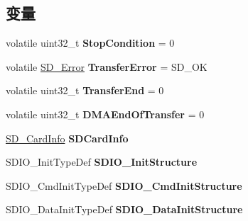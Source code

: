 \subsection*{变量}
\begin{DoxyCompactItemize}
\item 
volatile uint32\+\_\+t {\bfseries Stop\+Condition} = 0\hypertarget{group__sd__card__private_gaca9d38169402effc401361f52be012b7}{}\label{group__sd__card__private_gaca9d38169402effc401361f52be012b7}

\item 
volatile \hyperlink{group__sd__card_gacff91fa68daa1d1ee967b5b3fb3dbd8c}{S\+D\+\_\+\+Error} {\bfseries Transfer\+Error} = S\+D\+\_\+\+OK\hypertarget{group__sd__card__private_ga693e3b9d09509f9fd42386a5fc31bd0d}{}\label{group__sd__card__private_ga693e3b9d09509f9fd42386a5fc31bd0d}

\item 
volatile uint32\+\_\+t {\bfseries Transfer\+End} = 0\hypertarget{group__sd__card__private_ga2504eb031f79ab67e7b175815ea10cfc}{}\label{group__sd__card__private_ga2504eb031f79ab67e7b175815ea10cfc}

\item 
volatile uint32\+\_\+t {\bfseries D\+M\+A\+End\+Of\+Transfer} = 0\hypertarget{group__sd__card__private_gab4965c9dd85c339abfefd3fa9bf30bf4}{}\label{group__sd__card__private_gab4965c9dd85c339abfefd3fa9bf30bf4}

\item 
\hyperlink{struct_s_d___card_info}{S\+D\+\_\+\+Card\+Info} {\bfseries S\+D\+Card\+Info}\hypertarget{group__sd__card__private_gad9b4efaae93cd75532b18c0528a4ca3d}{}\label{group__sd__card__private_gad9b4efaae93cd75532b18c0528a4ca3d}

\item 
S\+D\+I\+O\+\_\+\+Init\+Type\+Def {\bfseries S\+D\+I\+O\+\_\+\+Init\+Structure}\hypertarget{group__sd__card__private_gad17d379a81412a4e045414fc358ec459}{}\label{group__sd__card__private_gad17d379a81412a4e045414fc358ec459}

\item 
S\+D\+I\+O\+\_\+\+Cmd\+Init\+Type\+Def {\bfseries S\+D\+I\+O\+\_\+\+Cmd\+Init\+Structure}\hypertarget{group__sd__card__private_gab48ffe3f6c5fdd6b06605dd4d99d5523}{}\label{group__sd__card__private_gab48ffe3f6c5fdd6b06605dd4d99d5523}

\item 
S\+D\+I\+O\+\_\+\+Data\+Init\+Type\+Def {\bfseries S\+D\+I\+O\+\_\+\+Data\+Init\+Structure}\hypertarget{group__sd__card__private_ga113c3ce26c1cd49c8b13fc1c9650f675}{}\label{group__sd__card__private_ga113c3ce26c1cd49c8b13fc1c9650f675}

\end{DoxyCompactItemize}


